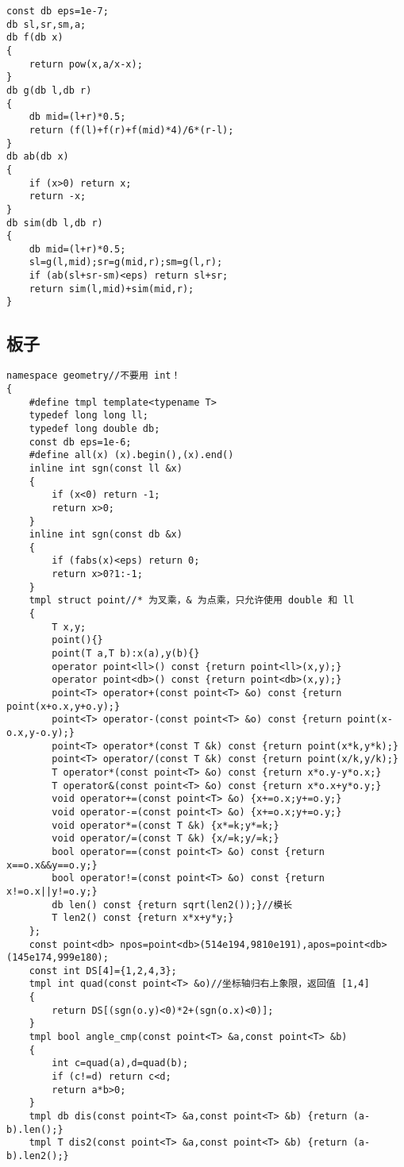 \documentclass[12pt]{ctexart}
\begin{document}
\begin{lstlisting}
const db eps=1e-7;
db sl,sr,sm,a;
db f(db x)
{
	return pow(x,a/x-x);
}
db g(db l,db r)
{
	db mid=(l+r)*0.5;
	return (f(l)+f(r)+f(mid)*4)/6*(r-l);
}
db ab(db x)
{
	if (x>0) return x;
	return -x;
}
db sim(db l,db r)
{
	db mid=(l+r)*0.5;
	sl=g(l,mid);sr=g(mid,r);sm=g(l,r);
	if (ab(sl+sr-sm)<eps) return sl+sr;
	return sim(l,mid)+sim(mid,r);
}
\end{lstlisting}

\subsection{板子}

\begin{lstlisting}
namespace geometry//不要用 int！
{
	#define tmpl template<typename T>
	typedef long long ll;
	typedef long double db;
	const db eps=1e-6;
	#define all(x) (x).begin(),(x).end()
	inline int sgn(const ll &x)
	{
		if (x<0) return -1;
		return x>0;
	}
	inline int sgn(const db &x)
	{
		if (fabs(x)<eps) return 0;
		return x>0?1:-1;
	}
	tmpl struct point//* 为叉乘，& 为点乘，只允许使用 double 和 ll
	{
		T x,y;
		point(){}
		point(T a,T b):x(a),y(b){}
		operator point<ll>() const {return point<ll>(x,y);}
		operator point<db>() const {return point<db>(x,y);}
		point<T> operator+(const point<T> &o) const {return point(x+o.x,y+o.y);}
		point<T> operator-(const point<T> &o) const {return point(x-o.x,y-o.y);}
		point<T> operator*(const T &k) const {return point(x*k,y*k);}
		point<T> operator/(const T &k) const {return point(x/k,y/k);}
		T operator*(const point<T> &o) const {return x*o.y-y*o.x;}
		T operator&(const point<T> &o) const {return x*o.x+y*o.y;}
		void operator+=(const point<T> &o) {x+=o.x;y+=o.y;}
		void operator-=(const point<T> &o) {x+=o.x;y+=o.y;}
		void operator*=(const T &k) {x*=k;y*=k;}
		void operator/=(const T &k) {x/=k;y/=k;}
		bool operator==(const point<T> &o) const {return x==o.x&&y==o.y;}
		bool operator!=(const point<T> &o) const {return x!=o.x||y!=o.y;}
		db len() const {return sqrt(len2());}//模长
		T len2() const {return x*x+y*y;}
	};
	const point<db> npos=point<db>(514e194,9810e191),apos=point<db>(145e174,999e180);
	const int DS[4]={1,2,4,3};
	tmpl int quad(const point<T> &o)//坐标轴归右上象限，返回值 [1,4]
	{
		return DS[(sgn(o.y)<0)*2+(sgn(o.x)<0)];
	}
	tmpl bool angle_cmp(const point<T> &a,const point<T> &b)
	{
		int c=quad(a),d=quad(b);
		if (c!=d) return c<d;
		return a*b>0;
	}
	tmpl db dis(const point<T> &a,const point<T> &b) {return (a-b).len();}
	tmpl T dis2(const point<T> &a,const point<T> &b) {return (a-b).len2();}

\end{lstlisting}
\end{document}
